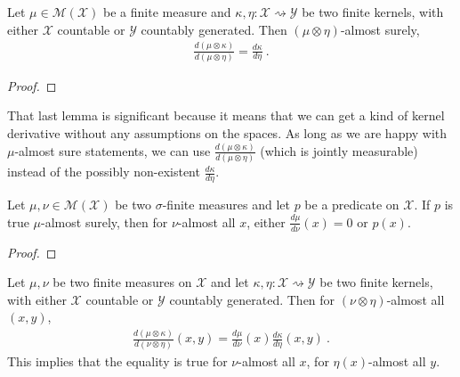 \begin{lemma}
  \label{cor:rnDeriv_compProd_right}
  \leanok
  Let $\mu \in \mathcal M(\mathcal X)$ be a finite measure and $\kappa, \eta : \mathcal X \rightsquigarrow \mathcal Y$ be two finite kernels, with either $\mathcal X$ countable or $\mathcal{Y}$ countably generated.
  Then $(\mu \otimes \eta)$-almost surely,
  \begin{align*}
  \frac{d (\mu \otimes \kappa)}{d (\mu \otimes \eta)} = \frac{d \kappa}{d \eta}
  \: .
  \end{align*}
\end{lemma}

\begin{proof}\leanok
{}

\end{proof}

That last lemma is significant because it means that we can get a kind of kernel derivative without any assumptions on the spaces.
As long as we are happy with $\mu$-almost sure statements, we can use $\frac{d (\mu \otimes \kappa)}{d (\mu \otimes \eta)}$ (which is jointly measurable) instead of the possibly non-existent $\frac{d \kappa}{d \eta}$.


\begin{lemma}
  \label{lem:ae_rnDeriv_ne_zero}
  \leanok
  \uses{}
  Let $\mu, \nu \in \mathcal M(\mathcal X)$ be two $\sigma$-finite measures and let $p$ be a predicate on $\mathcal X$.
  If $p$ is true $\mu$-almost surely, then for $\nu$-almost all $x$, either $\frac{d\mu}{d\nu}(x) = 0$ or $p(x)$.
\end{lemma}

\begin{proof}\leanok
\uses{}

\end{proof}


\begin{lemma}
  \label{lem:rnDeriv_compProd}
  \leanok
  Let $\mu, \nu$ be two finite measures on $\mathcal X$ and let $\kappa, \eta : \mathcal X \rightsquigarrow \mathcal Y$ be two finite kernels, with either $\mathcal X$ countable or $\mathcal{Y}$ countably generated.
  Then for $(\nu \otimes \eta)$-almost all $(x, y)$,
  \begin{align*}
  \frac{d (\mu \otimes \kappa)}{d (\nu \otimes \eta)}(x,y) = \frac{d\mu}{d\nu}(x)\frac{d \kappa}{d \eta}(x,y)
  \: .
  \end{align*}
  This implies that the equality is true for $\nu$-almost all $x$, for $\eta(x)$-almost all $y$.
\end{lemma}

